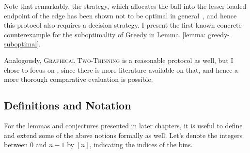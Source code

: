Note that remarkably, the \Greedy strategy, which allocates the ball into the lesser loaded endpoint of the edge has been shown not to be optimal in general~\cite{bansal2021twochoicegraphical}, and hence this protocol also requires a decision strategy. I present the first known concrete counterexample for the suboptimality of Greedy in Lemma~\ref{lemma: greedy-suboptimal}.


Analogously, \textsc{Graphical Two-Thinning} is a reasonable protocol as well, but I chose to focus on \GraphicalTwoChoice, since there is more literature available on that, and hence a more thorough comparative evaluation is possible.\\

\subsection{Definitions and Notation} \label{notation}

For the lemmas and conjectures presented in later chapters, it is useful to define and extend some of the above notions formally as well. Let's denote the integers between $0$ and $n-1$ by $[n]$, indicating the indices of the bins.


